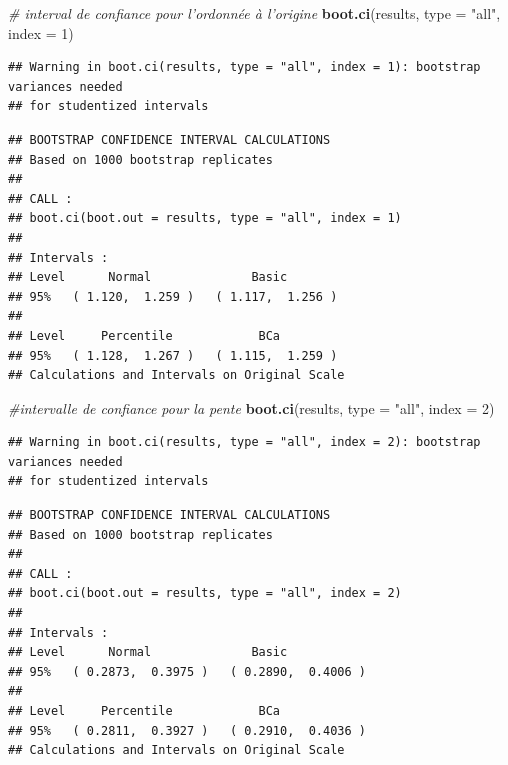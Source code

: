 \documentclass[12pt,]{book}
\newenvironment{Shaded}{\begin{snugshade}}{\end{snugshade}}
\newcommand{\CommentTok}[1]{\textcolor[rgb]{0.56,0.35,0.01}{\textit{#1}}}
\newcommand{\DataTypeTok}[1]{\textcolor[rgb]{0.13,0.29,0.53}{#1}}
\newcommand{\DecValTok}[1]{\textcolor[rgb]{0.00,0.00,0.81}{#1}}
\newcommand{\KeywordTok}[1]{\textcolor[rgb]{0.13,0.29,0.53}{\textbf{#1}}}
\newcommand{\NormalTok}[1]{#1}
\newcommand{\StringTok}[1]{\textcolor[rgb]{0.31,0.60,0.02}{#1}}
\begin{document}
\begin{Shaded}
\begin{Highlighting}[]
\CommentTok{# interval de confiance pour l'ordonnée à l'origine}
\KeywordTok{boot.ci}\NormalTok{(results, }\DataTypeTok{type =} \StringTok{"all"}\NormalTok{, }\DataTypeTok{index =} \DecValTok{1}\NormalTok{)}
\end{Highlighting}
\end{Shaded}

\begin{verbatim}
## Warning in boot.ci(results, type = "all", index = 1): bootstrap variances needed
## for studentized intervals
\end{verbatim}

\begin{verbatim}
## BOOTSTRAP CONFIDENCE INTERVAL CALCULATIONS
## Based on 1000 bootstrap replicates
## 
## CALL : 
## boot.ci(boot.out = results, type = "all", index = 1)
## 
## Intervals : 
## Level      Normal              Basic         
## 95%   ( 1.120,  1.259 )   ( 1.117,  1.256 )  
## 
## Level     Percentile            BCa          
## 95%   ( 1.128,  1.267 )   ( 1.115,  1.259 )  
## Calculations and Intervals on Original Scale
\end{verbatim}

\begin{Shaded}
\begin{Highlighting}[]
\CommentTok{#intervalle de confiance pour la pente}
\KeywordTok{boot.ci}\NormalTok{(results, }\DataTypeTok{type =} \StringTok{"all"}\NormalTok{, }\DataTypeTok{index =} \DecValTok{2}\NormalTok{)}
\end{Highlighting}
\end{Shaded}

\begin{verbatim}
## Warning in boot.ci(results, type = "all", index = 2): bootstrap variances needed
## for studentized intervals
\end{verbatim}

\begin{verbatim}
## BOOTSTRAP CONFIDENCE INTERVAL CALCULATIONS
## Based on 1000 bootstrap replicates
## 
## CALL : 
## boot.ci(boot.out = results, type = "all", index = 2)
## 
## Intervals : 
## Level      Normal              Basic         
## 95%   ( 0.2873,  0.3975 )   ( 0.2890,  0.4006 )  
## 
## Level     Percentile            BCa          
## 95%   ( 0.2811,  0.3927 )   ( 0.2910,  0.4036 )  
## Calculations and Intervals on Original Scale
\end{verbatim}
\end{document}
